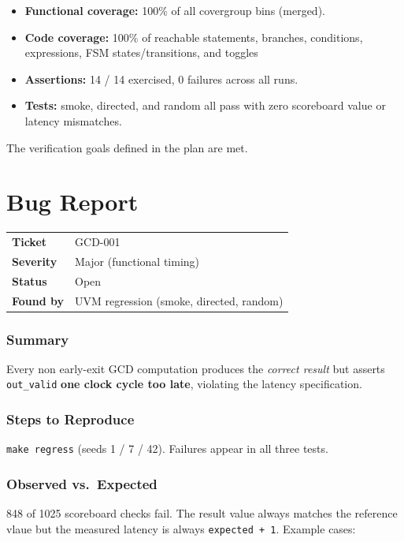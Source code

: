 \documentclass[11pt,a4paper]{article}
\begin{document}
{\begin{itemize}
  \item \textbf{Functional coverage:} 100\% of all covergroup bins (merged).
  \item \textbf{Code coverage:} 100\% of reachable statements, branches,
        conditions, expressions, FSM states/transitions, and toggles
  \item \textbf{Assertions:} 14 / 14 exercised, 0 failures across all runs.
  \item \textbf{Tests:} smoke, directed, and random all pass with zero scoreboard
        value or latency mismatches.
\end{itemize}

The verification goals defined in the plan are met.

\newpage
\part{Bug Report}

\begin{table}[H]
\centering
\begin{tabular}{ll}
\textbf{Ticket} & GCD-001 \\
\textbf{Severity} & Major (functional timing) \\
\textbf{Status} & Open \\
\textbf{Found by} & UVM regression (smoke, directed, random) \\
\end{tabular}
\end{table}

\section*{Summary}
Every non early-exit GCD computation produces the \emph{correct result} but asserts
\texttt{out\_valid} \textbf{one clock cycle too late}, violating the latency
specification.

\section*{Steps to Reproduce}
\texttt{make regress} (seeds 1 / 7 / 42). Failures appear in all three tests.

\section*{Observed vs.\ Expected}
848 of 1025 scoreboard checks fail. The result value always matches the reference vlaue but the measured latency is always \texttt{expected + 1}. Example cases:

}
\end{document}
